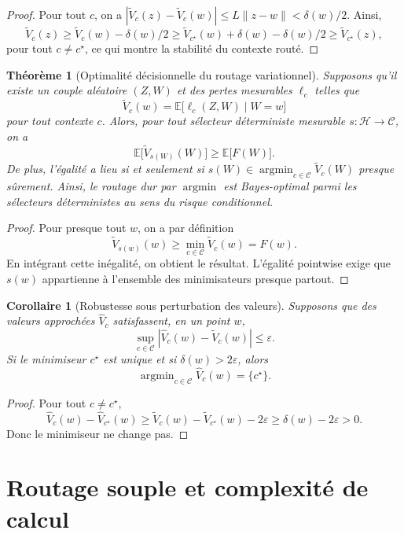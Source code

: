 \documentclass[11pt,a4paper]{article}
\newtheorem{theorem}{Théorème}[section]
\newtheorem{corollary}{Corollaire}[section]
\DeclareMathOperator{\argmin}{argmin}
\newcommand{\Hh}{\mathcal H}
\newcommand{\Ccal}{\mathcal C}
\begin{document}
\begin{proof}
Pour tout \(c\), on a \(|\widetilde V_c(z)-\widetilde V_c(w)|\le L\|z-w\|<\delta(w)/2\). Ainsi,
\[
\widetilde V_c(z)\ge \widetilde V_c(w)-\delta(w)/2\ge \widetilde V_{c^\star}(w)+\delta(w)-\delta(w)/2\ge \widetilde V_{c^\star}(z),
\]
pour tout \(c\neq c^\star\), ce qui montre la stabilité du contexte routé.
\end{proof}

\begin{theorem}[Optimalité décisionnelle du routage variationnel]
Supposons qu'il existe un couple aléatoire \((Z,W)\) et des pertes mesurables \(\ell_c\) telles que
\[
\widetilde V_c(w)=\mathbb E\bigl[\ell_c(Z,W)\mid W=w\bigr]
\]
pour tout contexte \(c\). Alors, pour tout sélecteur déterministe mesurable \(s:\Hh\to\Ccal\), on a
\[
\mathbb E\bigl[\widetilde V_{s(W)}(W)\bigr]\ge \mathbb E\bigl[F(W)\bigr].
\]
De plus, l'égalité a lieu si et seulement si \(s(W)\in\argmin_{c\in\Ccal}\widetilde V_c(W)\) presque sûrement. Ainsi, le routage dur par \(\argmin\) est Bayes-optimal parmi les sélecteurs déterministes au sens du risque conditionnel.
\end{theorem}

\begin{proof}
Pour presque tout \(w\), on a par définition
\[
\widetilde V_{s(w)}(w)\ge \min_{c\in\Ccal}\widetilde V_c(w)=F(w).
\]
En intégrant cette inégalité, on obtient le résultat. L'égalité pointwise exige que \(s(w)\) appartienne à l'ensemble des minimisateurs presque partout.
\end{proof}

\begin{corollary}[Robustesse sous perturbation des valeurs]
Supposons que des valeurs approchées \(\widehat V_c\) satisfassent, en un point \(w\),
\[
\sup_{c\in\Ccal}|\widehat V_c(w)-\widetilde V_c(w)|\le \varepsilon.
\]
Si le minimiseur \(c^\star\) est unique et si \(\delta(w)>2\varepsilon\), alors
\[
\argmin_{c\in\Ccal}\widehat V_c(w)=\{c^\star\}.
\]
\end{corollary}

\begin{proof}
Pour tout \(c\neq c^\star\),
\[
\widehat V_c(w)-\widehat V_{c^\star}(w)
\ge \widetilde V_c(w)-\widetilde V_{c^\star}(w)-2\varepsilon
\ge \delta(w)-2\varepsilon>0.
\]
Donc le minimiseur ne change pas.
\end{proof}

\section{Routage souple et complexité de calcul}
\end{document}
